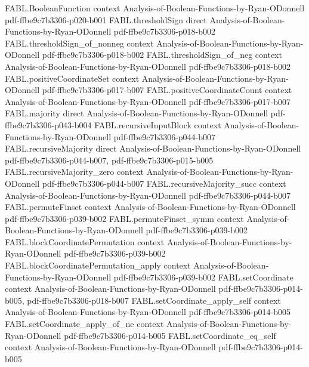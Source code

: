 \begin{theorem}
  {FABL.BooleanFunction}
  {context}
  {Analysis-of-Boolean-Functions-by-Ryan-ODonnell}
  {pdf-ffbe9c7b3306-p020-b001}
\proofstep
  {FABL.thresholdSign}
  {direct}
  {Analysis-of-Boolean-Functions-by-Ryan-ODonnell}
  {pdf-ffbe9c7b3306-p018-b002}
\proofstep
  {FABL.thresholdSign_of_nonneg}
  {context}
  {Analysis-of-Boolean-Functions-by-Ryan-ODonnell}
  {pdf-ffbe9c7b3306-p018-b002}
\proofstep
  {FABL.thresholdSign_of_neg}
  {context}
  {Analysis-of-Boolean-Functions-by-Ryan-ODonnell}
  {pdf-ffbe9c7b3306-p018-b002}
\proofstep
  {FABL.positiveCoordinateSet}
  {context}
  {Analysis-of-Boolean-Functions-by-Ryan-ODonnell}
  {pdf-ffbe9c7b3306-p017-b007}
\proofstep
  {FABL.positiveCoordinateCount}
  {context}
  {Analysis-of-Boolean-Functions-by-Ryan-ODonnell}
  {pdf-ffbe9c7b3306-p017-b007}
\proofstep
  {FABL.majority}
  {direct}
  {Analysis-of-Boolean-Functions-by-Ryan-ODonnell}
  {pdf-ffbe9c7b3306-p043-b004}
\proofstep
  {FABL.recursiveInputBlock}
  {context}
  {Analysis-of-Boolean-Functions-by-Ryan-ODonnell}
  {pdf-ffbe9c7b3306-p044-b007}
\proofstep
  {FABL.recursiveMajority}
  {direct}
  {Analysis-of-Boolean-Functions-by-Ryan-ODonnell}
  {pdf-ffbe9c7b3306-p044-b007,
    pdf-ffbe9c7b3306-p015-b005}
\proofstep
  {FABL.recursiveMajority_zero}
  {context}
  {Analysis-of-Boolean-Functions-by-Ryan-ODonnell}
  {pdf-ffbe9c7b3306-p044-b007}
\proofstep
  {FABL.recursiveMajority_succ}
  {context}
  {Analysis-of-Boolean-Functions-by-Ryan-ODonnell}
  {pdf-ffbe9c7b3306-p044-b007}
\proofstep
  {FABL.permuteFinset}
  {context}
  {Analysis-of-Boolean-Functions-by-Ryan-ODonnell}
  {pdf-ffbe9c7b3306-p039-b002}
\proofstep
  {FABL.permuteFinset_symm}
  {context}
  {Analysis-of-Boolean-Functions-by-Ryan-ODonnell}
  {pdf-ffbe9c7b3306-p039-b002}
\proofstep
  {FABL.blockCoordinatePermutation}
  {context}
  {Analysis-of-Boolean-Functions-by-Ryan-ODonnell}
  {pdf-ffbe9c7b3306-p039-b002}
\proofstep
  {FABL.blockCoordinatePermutation_apply}
  {context}
  {Analysis-of-Boolean-Functions-by-Ryan-ODonnell}
  {pdf-ffbe9c7b3306-p039-b002}
\proofstep
  {FABL.setCoordinate}
  {context}
  {Analysis-of-Boolean-Functions-by-Ryan-ODonnell}
  {pdf-ffbe9c7b3306-p014-b005,
    pdf-ffbe9c7b3306-p018-b007}
\proofstep
  {FABL.setCoordinate_apply_self}
  {context}
  {Analysis-of-Boolean-Functions-by-Ryan-ODonnell}
  {pdf-ffbe9c7b3306-p014-b005}
\proofstep
  {FABL.setCoordinate_apply_of_ne}
  {context}
  {Analysis-of-Boolean-Functions-by-Ryan-ODonnell}
  {pdf-ffbe9c7b3306-p014-b005}
\proofstep
  {FABL.setCoordinate_eq_self}
  {context}
  {Analysis-of-Boolean-Functions-by-Ryan-ODonnell}
  {pdf-ffbe9c7b3306-p014-b005}

\end{theorem}
